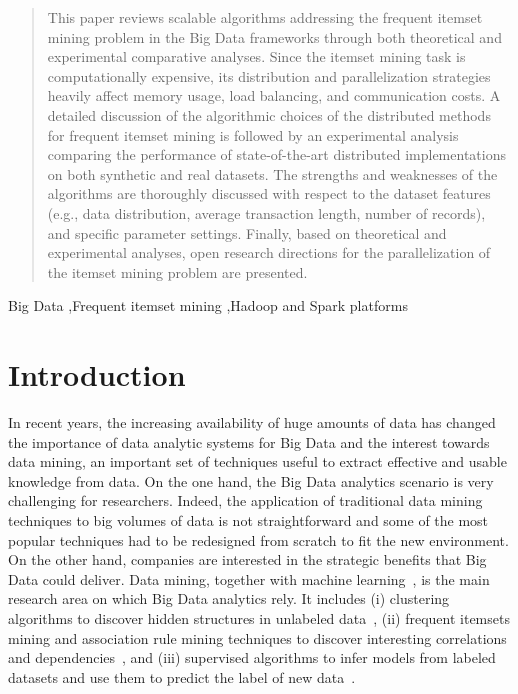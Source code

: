 \documentclass[preprint,review,12pt]{elsarticle}
\begin{document}
\begin{frontmatter}
\begin{abstract}
This paper reviews scalable algorithms addressing the frequent itemset mining 
problem in the Big Data frameworks through both theoretical and experimental 
comparative analyses. 
Since the itemset mining task is computationally expensive, its distribution and 
parallelization strategies heavily affect memory usage, load balancing, 
and communication costs.  
A detailed discussion of the algorithmic choices of the  
distributed methods for frequent itemset mining is followed by an experimental 
analysis comparing the performance of state-of-the-art distributed implementations on both 
synthetic and real datasets. 
The strengths and weaknesses of the algorithms are
thoroughly discussed with respect 
to the dataset features (e.g., data distribution, average 
transaction length, number of records), 
and specific parameter settings. 
Finally, based on theoretical and experimental analyses, open 
research directions for the parallelization of the itemset mining problem 
are presented.
\end{abstract}

\begin{keyword}
Big Data \sep Frequent itemset mining \sep Hadoop and Spark platforms




\end{keyword}

\end{frontmatter}


\section{Introduction}
\label{Introduction}
In recent years, the increasing availability of huge amounts of data has changed the importance of
data analytic systems for Big Data and the interest towards data mining, an important set of techniques useful to extract effective and usable knowledge
from data.
On the one hand, the Big Data analytics scenario is very challenging for researchers. Indeed, 
the application of traditional data mining techniques to big
volumes of data is not straightforward and 
some of the most popular techniques had to be redesigned from
scratch to fit the new environment.
On the other hand, companies are
interested in the strategic benefits that Big Data could deliver.
Data mining, together with machine learning~\cite{DBLP:journals/bdr/Al-JarrahYMKT15}, is the main research area on which Big Data analytics
rely. It includes (i) clustering
algorithms to discover hidden structures in unlabeled
data~\cite{Xu_2005SurveyClustering}, (ii) frequent itemsets mining and association
rule mining techniques to discover interesting correlations and
dependencies~\cite{Han_2007SurveyFIM}, and (iii) supervised algorithms 
to infer models from labeled datasets and use them to predict the label of new data~\cite{AggarwalBookClassification}.
\end{document}

